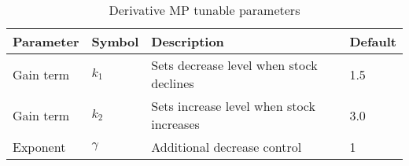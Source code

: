 \begin{table}[h]
\centering
\caption{Derivative MP tunable parameters}
\begin{tabular}{p{3cm}p{1.2cm}p{6cm}p{2cm}} 
  \hline
  Parameter & Symbol & Description & Default \\ 
  \hline
   Gain term &$k_1$    & Sets decrease level when stock declines  &1.5 \\
   Gain term &$k_2$    & Sets increase level when stock increases &3.0 \\
   Exponent  &$\gamma$ & Additional decrease control              & 1  \\
  \hline
\end{tabular}
\end{table}

